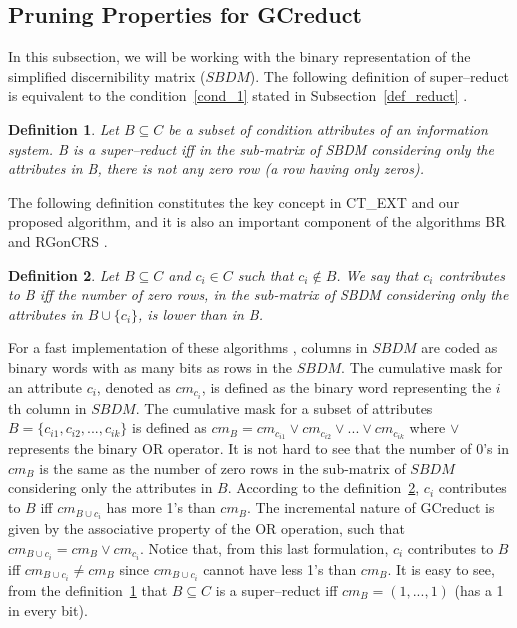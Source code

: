 \documentclass[authoryear,preprint,review,12pt]{elsarticle}
\newtheorem{definition}{Definition}
\begin{document}
  
\subsection{Pruning Properties for GCreduct}\label{properties}
	In this subsection, we will be working with the binary representation of the simplified discernibility matrix
	($SBDM$). The following definition of super--reduct is equivalent to the condition~\ref{cond_1} stated in 
	Subsection~\ref{def_reduct} \citep{Lazo15}.
	
	\begin{definition}\label{def:testor}
		Let $B \subseteq C$ be a subset of condition attributes of an information system. B is a super--reduct 
		iff in the sub-matrix of SBDM considering only the attributes in B, there is not any zero row (a row 
		having only zeros).
	\end{definition}
	
	The following definition constitutes the key concept in CT\_EXT \citep{Sanchez07} and our proposed algorithm, and it is also an important component of the algorithms BR \citep{Lias09} and RGonCRS
	\citep{WangP07}.
		
	\begin{definition}\label{def:contrib}
		Let $B \subseteq C$ and  $c_i \in C$ such that $c_i \notin B$. We say that $c_i$ contributes to B iff the
		number of zero rows, in the sub-matrix of SBDM considering only the attributes in 
		$B\cup\{c_i\}$, is lower than in B.
	\end{definition}		
		
	For a fast implementation of these algorithms \citep{Sanchez10,Lias13}, columns in $SBDM$ are coded as binary
	words with as many bits as rows in the $SBDM$. The cumulative mask for an attribute $c_i$, denoted as $cm_{c_i}$, is defined as the binary word representing the $i$th column in $SBDM$. The cumulative mask for a subset of attributes $B=\lbrace c_{i1},c_{i2},...,c_{ik} \rbrace$ is defined	as $cm_B = cm_{c_{i1}} \vee cm_{c_{i2}} \vee ... \vee cm_{c_{ik}}$ where $\vee$ represents the binary OR operator. It is not hard to see that the number of 0's in $cm_B$ is the same as the number of zero rows in the sub-matrix of $SBDM$ considering only the attributes in $B$. 
	According to the definition~\ref{def:contrib}, $c_i$ contributes to $B$ iff $cm_{B\cup c_i}$ has more 1's than 
	$cm_B$. The incremental nature of GCreduct is given by the associative property of the OR operation, such that 
	$cm_{B\cup c_i}=cm_B\vee cm_{c_i}$. Notice that, from this last formulation, $c_i$ contributes to $B$ iff 
	$cm_{B\cup c_i}\neq cm_B$ since $cm_{B\cup c_i}$ cannot have less 1's than $cm_B$. It is easy to see, from the
	definition~\ref{def:testor} that $B \subseteq C$ is a super--reduct iff $cm_B=(1,...,1)$ (has a 1 in every bit).
\end{document}
